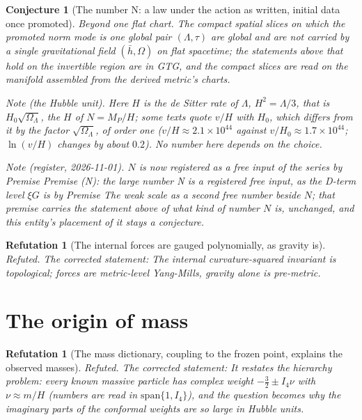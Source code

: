 \documentclass[11pt]{article}
\newtheorem{conjecture}[theorem]{Conjecture}
\newtheorem{refutation}[theorem]{Refutation}
\theoremstyle{definition}
\theoremstyle{plain}
\providecommand{\hb}{}\renewcommand{\hb}{\bar{h}}
\begin{document}
\begin{conjecture}[The number N: a law under the action as written, initial data once promoted]
\emph{Beyond one flat chart.} The compact spatial slices on which the promoted norm mode is one global pair $(\Lambda, \tau)$ are global and are not carried by a single gravitational field $(\hb, \Omega)$ on flat spacetime; the statements above that hold on the invertible region are in GTG, and the compact slices are read on the manifold assembled from the derived metric's charts.

\emph{Note (the Hubble unit).} Here $H$ is the de Sitter rate of $\Lambda$, $H^{2} = \Lambda/3$, that is $H_{0}\sqrt{\Omega_{\Lambda}}$, the $H$ of $N = M_{P}/H$; some texts quote $v/H$ with $H_{0}$, which differs from it by the factor $\sqrt{\Omega_{\Lambda}}$, of order one ($v/H \approx 2.1 \times 10^{44}$ against $v/H_{0} \approx 1.7 \times 10^{44}$; $\ln(v/H)$ changes by about $0.2$). No number here depends on the choice.

\emph{Note (register, 2026-11-01).} $N$ is now registered as a free input of the series by Premise \emph{Premise (N): the large number N is a registered free input}, as the D-term level $\xi G$ is by Premise \emph{The weak scale as a second free number beside $N$}; that premise carries the statement above of what kind of number $N$ is, unchanged, and this entity's placement of it stays a conjecture.
\end{conjecture}

\begin{refutation}[The internal forces are gauged polynomially, as gravity is]\label{c:refuted.the-internal-forces-are-gauged-polynomially-as-g}
Refuted. The corrected statement: The internal curvature-squared invariant is topological; forces are metric-level Yang-Mills, gravity alone is pre-metric.
\end{refutation}

\section{The origin of mass}

\begin{refutation}[The mass dictionary, coupling to the frozen point, explains the observed masses]\label{c:refuted.the-mass-dictionary-coupling-to-the-frozen-point}
Refuted. The corrected statement: It restates the hierarchy problem: every known massive particle has complex weight $-\tfrac32 \pm I_4\nu$ with $\nu \approx m/H$ (numbers are read in $\mathrm{span}\{1, I_4\}$), and the question becomes why the imaginary parts of the conformal weights are so large in Hubble units.
\end{refutation}
\end{document}
